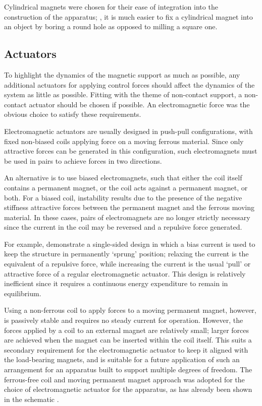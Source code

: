 \documentclass[11pt,a4paper]{memoir}
\begin{document}
Cylindrical magnets were chosen for their ease of integration into the
construction of the apparatus; \eg, it is much easier to fix a cylindrical magnet
into an object by boring a round hole as opposed to milling a square one.

\subsection{Actuators}

To highlight the dynamics of the magnetic support as much as possible, any
additional actuators for applying control forces should affect the dynamics of
the system as little as possible. Fitting with the theme of non-contact
support, a non-contact actuator should be chosen if possible. An
electromagnetic force was the obvious choice to satisfy these requirements.

Electromagnetic actuators are usually designed in push-pull configurations,
with fixed non-biased coils applying force on a moving ferrous material. Since
only attractive forces can be generated in this configuration, such
electromagnets must be used in pairs to achieve forces in two directions.

An alternative is to use biased electromagnets, such that either the coil
itself contains a permanent magnet, or the coil acts against a permanent
magnet, or both. For a biased coil, instability results due to the presence of
the negative stiffness attractive forces between the permanent magnet and the
ferrous moving material. In these cases, pairs of electromagnets are no longer
strictly necessary since the current in the coil may be reversed and a
repulsive force generated.

For example, \textcite{nandi2009} demonstrate a single-sided design in which a
bias current is used to keep the structure in permanently `sprung' position;
relaxing the current is the equivalent of a repulsive force, while increasing
the current is the usual `pull' or attractive force of a regular
electromagnetic actuator. This design is relatively inefficient since it
requires a continuous energy expenditure to remain in equilibrium.

Using a non-ferrous coil to apply forces to a moving permanent magnet,
however, is passively stable and requires no steady current for operation.
However, the forces applied by a coil to an external magnet are relatively
small; larger forces are achieved when the magnet can be inserted within the
coil itself. This suits a secondary requirement for the electromagnetic
actuator to keep it aligned with the load-bearing magnets, and is suitable for a
future application of such an arrangement for an apparatus built to support
multiple degrees of freedom. The ferrous-free coil and moving permanent magnet
approach was adopted for the choice of electromagnetic actuator for the apparatus,
as has already been shown in the schematic .
\end{document}
